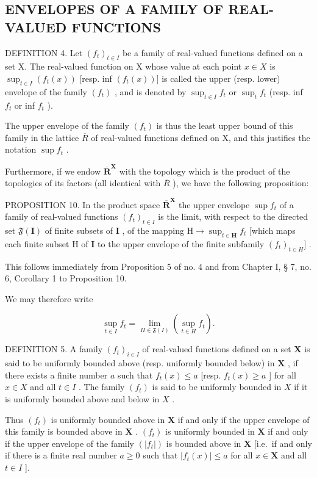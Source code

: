 \subsection{ENVELOPES OF A FAMILY OF REAL-VALUED FUNCTIONS}

DEFINITION 4. Let \((f_{t})_{t\in I}\) be a family of real-valued functions defined on a set X. The real-valued function on X whose value at each point \(x\in X\) is \(\sup_{t\in I}(f_t(x))\) {[}resp. inf \((f_t(x))]\) is called the upper (resp. lower) envelope of the family \((f_t)\) , and is denoted by \(\sup_{t\in I}f_{t}\) or \(\sup_{t}f_{t}\) (resp. inf \(f_{t}\) or inf \(f_{t}\) ).

The upper envelope of the family \((f_{t})\) is thus the least upper bound of this family in the lattice \(\overline{R}\) of real-valued functions defined on X, and this justifies the notation \(\sup f_{t}\) .

Furthermore, if we endow \(\overline{\mathbf{R}}^{\mathbf{X}}\) with the topology which is the product of the topologies of its factors (all identical with \(\overline{R}\) ), we have the following proposition:

PROPOSITION 10. In the product space \(\overline{\mathbf{R}}^{\mathbf{X}}\) the upper envelope \(\sup f_{t}\) of a family of real-valued functions \((f_{t})_{t\in I}\) is the limit, with respect to the directed set \(\mathfrak{F}(\mathbf{I})\) of finite subsets of \(\mathbf{I}\) , of the mapping \(\mathrm{H}\to \sup_{t\in \mathbf{H}}f_t\) {[}which maps each finite subset \(\mathrm{H}\) of \(\mathbf{I}\) to the upper envelope of the finite subfamily \((f_{t})_{t\in H}]\) .

This follows immediately from Proposition 5 of no. 4 and from Chapter I, § 7, no. 6, Corollary 1 to Proposition 10.

We may therefore write

\[
\sup _ {t \in I} f _ {t} = \lim _ {H \in \mathfrak {F} (I)} \left(\sup _ {t \in H} f _ {t}\right).\tag{9}
\]

DEFINITION 5. A family \((f_t)_{i\in I}\) of real-valued functions defined on a set \(\mathbf{X}\) is said to be uniformly bounded above (resp. uniformly bounded below) in \(\mathbf{X}\) , if there exists a finite number \(a\) such that \(f_{t}(x) \leqslant a\) {[}resp. \(f_{t}(x) \geqslant a\) {]} for all \(x \in X\) and all \(t \in I\) . The family \((f_{t})\) is said to be uniformly bounded in \(X\) if it is uniformly bounded above and below in \(X\) .

Thus \((f_{t})\) is uniformly bounded above in \(\mathbf{X}\) if and only if the upper envelope of this family is bounded above in \(\mathbf{X}\) . \((f_{t})\) is uniformly bounded in \(\mathbf{X}\) if and only if the upper envelope of the family \((|f_{t}|)\) is bounded above in \(\mathbf{X}\) {[}i.e.~if and only if there is a finite real number \(a \geqslant 0\) such that \(|f_{t}(x)| \leqslant a\) for all \(x \in \mathbf{X}\) and all \(t \in I\) {]}.


